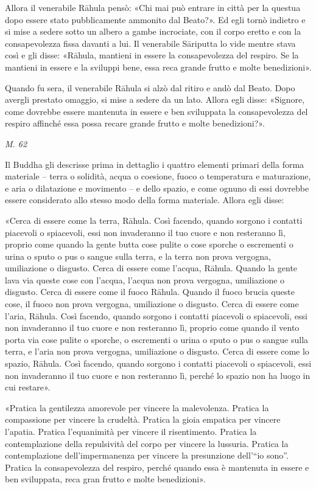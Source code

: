 Allora il venerabile Rāhula pensò: «Chi mai può entrare in città per la
questua dopo essere stato pubblicamente ammonito dal Beato?». Ed egli
tornò indietro e si mise a sedere sotto un albero a gambe incrociate,
con il corpo eretto e con la consapevolezza fissa davanti a lui. Il
venerabile Sāriputta lo vide mentre stava così e gli disse: «Rāhula,
mantieni in essere la consapevolezza del respiro. Se la mantieni in
essere e la sviluppi bene, essa reca grande frutto e molte benedizioni».


Quando fu sera, il venerabile Rāhula si alzò dal ritiro e andò dal
Beato. Dopo avergli prestato omaggio, si mise a sedere da un lato.
Allora egli disse: «Signore, come dovrebbe essere mantenuta in essere e
ben sviluppata la consapevolezza del respiro affinché essa possa recare
grande frutto e molte benedizioni?».


\emph{M. 62}


 Il Buddha gli descrisse prima in dettaglio i quattro
elementi primari della forma materiale – terra o solidità, acqua o
coesione, fuoco o temperatura e maturazione, e aria o dilatazione e
movimento – e dello spazio, e come ognuno di essi dovrebbe essere
considerato allo stesso modo della forma materiale. Allora egli disse:


 «Cerca di essere come la terra, Rāhula. Così facendo, quando
sorgono i contatti piacevoli o spiacevoli, essi non invaderanno il tuo
cuore e non resteranno lì, proprio come quando la gente butta cose
pulite o cose sporche o escrementi o urina o sputo o pus o sangue sulla
terra, e la terra non prova vergogna, umiliazione o disgusto. Cerca di
essere come l’acqua, Rāhula. Quando la gente lava via queste cose con
l’acqua, l’acqua non prova vergogna, umiliazione o disgusto. Cerca di
essere come il fuoco Rāhula. Quando il fuoco brucia queste cose, il
fuoco non prova vergogna, umiliazione o disgusto. Cerca di essere come
l’aria, Rāhula. Così facendo, quando sorgono i contatti piacevoli o
spiacevoli, essi non invaderanno il tuo cuore e non resteranno lì,
proprio come quando il vento porta via cose pulite o sporche, o
escrementi o urina o sputo o pus o sangue sulla terra, e l’aria non
prova vergogna, umiliazione o disgusto. Cerca di essere come lo spazio,
Rāhula. Così facendo, quando sorgono i contatti piacevoli o spiacevoli,
essi non invaderanno il tuo cuore e non resteranno lì, perché lo spazio
non ha luogo in cui restare».


«Pratica la gentilezza amorevole per vincere la malevolenza. Pratica la
compassione per vincere la crudeltà. Pratica la gioia empatica per
vincere l’apatia. Pratica l’equanimità per vincere il risentimento.
Pratica la contemplazione della repulsività del corpo per vincere la
lussuria. Pratica la contemplazione dell’impermanenza per vincere la
presunzione dell’“io sono”. Pratica la consapevolezza del respiro,
perché quando essa è mantenuta in essere e ben sviluppata, reca gran
frutto e molte benedizioni».


